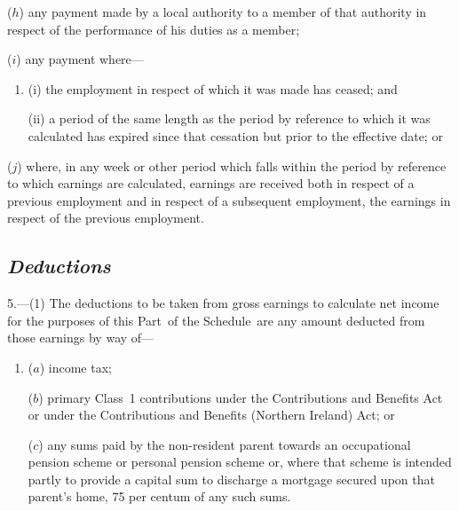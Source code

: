 \documentclass[12pt,a4paper]{article}
\begin{document}
\begin{enumerate}
($h$) any payment made by a local authority to a member of that authority in respect of the performance of his duties as a member;

($i$) any payment where—
\begin{enumerate}\item[]
(i) the employment in respect of which it was made has ceased; and

(ii) a period of the same length as the period by reference to which it was calculated has expired since that cessation but prior to the effective date; or
\end{enumerate}

($j$) where, in any week or other period which falls within the period by reference to which earnings are calculated, earnings are received both in respect of a previous employment and in respect of a subsequent employment, the earnings in respect of the previous employment.
\end{enumerate}


\subsection*{\itshape Deductions}

5.---(1)  The deductions to be taken from gross earnings to calculate net income for the purposes of this Part~of the Schedule~are any amount deducted from those earnings by way of—
\begin{enumerate}\item[]
($a$) income tax;

($b$) primary Class~1 contributions under the Contributions and Benefits Act or under the Contributions and Benefits (Northern Ireland) Act; or

($c$) any sums paid by the non-resident parent towards an occupational pension scheme or personal pension scheme or, where that scheme is intended partly to provide a capital sum to discharge a mortgage secured upon that parent’s home, 75 per centum of any such sums.
\end{enumerate}
\end{document}
